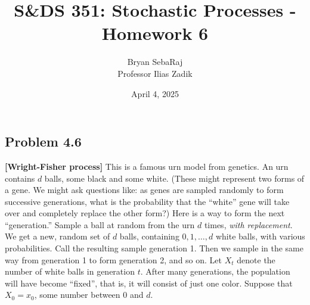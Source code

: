 \documentclass{article}
\title{S\&DS 351: Stochastic Processes - Homework 6}
\author{Bryan SebaRaj \\[0.8em] Professor Ilias Zadik}
\date{April 4, 2025}
\begin{document}
\maketitle

\subsection*{Problem 4.6}
\textbf{[Wright-Fisher process]} This is a famous urn model from genetics. An urn contains $d$ balls, some black and some white. (These might represent two forms of a gene. We might ask questions like: as genes are sampled randomly to form successive generations, what is the probability that the “white” gene will take over and completely replace the other form?) Here is a way to form the next “generation.” Sample a ball at random from the urn $d$ times, \textit{with replacement}. We get a new, random set of $d$ balls, containing $0, 1, \ldots, d$ white balls, with various probabilities. Call the resulting sample generation 1. Then we sample in the same way from generation 1 to form generation 2, and so on. Let $X_t$ denote the number of white balls in generation $t$. After many generations, the population will have become “fixed”, that is, it will consist of just one color. Suppose that $X_0 = x_0$, some number between $0$ and $d$.
\end{document}
